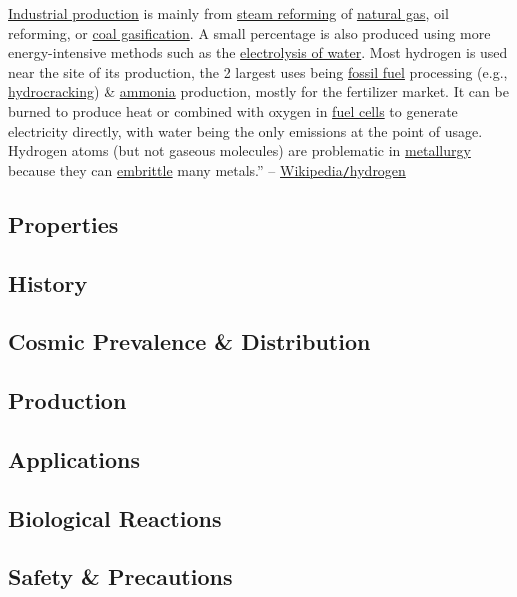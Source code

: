 \documentclass{article}
\begin{document}
\href{https://en.wikipedia.org/wiki/Hydrogen_production}{Industrial production} is mainly from \href{https://en.wikipedia.org/wiki/Steam_reforming}{steam reforming} of \href{https://en.wikipedia.org/wiki/Natural_gas}{natural gas}, oil reforming, or \href{https://en.wikipedia.org/wiki/Coal_gasification}{coal gasification}. A small percentage is also produced using more energy-intensive methods such as the \href{https://en.wikipedia.org/wiki/Electrolysis_of_water}{electrolysis of water}. Most hydrogen is used near the site of its production, the 2 largest uses being \href{https://en.wikipedia.org/wiki/Fossil_fuel}{fossil fuel} processing (e.g., \href{https://en.wikipedia.org/wiki/Hydrocracking}{hydrocracking}) \& \href{https://en.wikipedia.org/wiki/Ammonia}{ammonia} production, mostly for the fertilizer market. It can be burned to produce heat or combined with oxygen in \href{https://en.wikipedia.org/wiki/Fuel_cells}{fuel cells} to generate electricity directly, with water being the only emissions at the point of usage. Hydrogen atoms (but not gaseous molecules) are problematic in \href{https://en.wikipedia.org/wiki/Metallurgy}{metallurgy} because they can \href{https://en.wikipedia.org/wiki/Hydrogen_embrittlement}{embrittle} many metals.'' -- \href{https://en.wikipedia.org/wiki/Hydrogen}{Wikipedia\texttt{/}hydrogen}

\subsection{Properties}

\subsection{History}

\subsection{Cosmic Prevalence \& Distribution}

\subsection{Production}

\subsection{Applications}

\subsection{Biological Reactions}

\subsection{Safety \& Precautions}


\printbibliography[heading=bibintoc]
	
\end{document}
